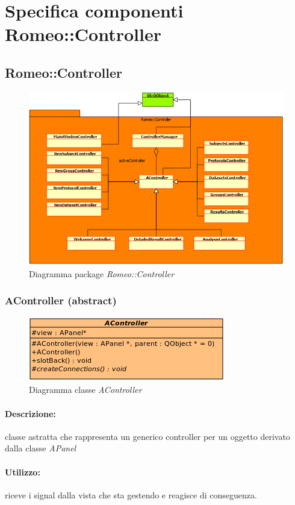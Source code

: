\section{Specifica componenti Romeo::Controller}
\subsection{Romeo::Controller}
	\begin{figure} [!h]
		\centering
		\includegraphics[scale=0.5] {../Specifica_Tecnica/Content/Immagini/Romeo__Controller.png}
		\caption{Diagramma package \textsl{Romeo::Controller}}
	\end{figure}
	\subsubsection{AController (abstract)}
	\begin{figure}[!h]
		\centering
		\includegraphics[width=0.5\linewidth]{./Content/Immagini/controller/AController.png}
		\caption{Diagramma classe \textsl{AController}}
	\end{figure}
	\paragraph{Descrizione:} classe astratta che rappresenta un generico controller per un oggetto derivato dalla classe \textsl{APanel}
	\paragraph{Utilizzo:} riceve i signal\g{} dalla vista che sta gestendo e reagisce di conseguenza.
